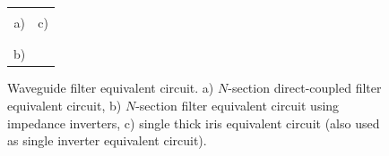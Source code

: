 \documentclass{pj}
\begin{document}
\begin{figure}[h]
  \begin{tabular}{cc}
     & 
    \\
    a) & c) \\
    & \\
     & \\
    b) & \\
  \end{tabular}
  
  \caption{Waveguide filter equivalent circuit.  a) $N$-section
    direct-coupled filter equivalent circuit, b) $N$-section filter
    equivalent circuit using impedance inverters, c) single thick
    iris equivalent circuit (also used as single inverter equivalent circuit).}
  \label{fig:circuit:1}
\end{figure}
\end{document}
